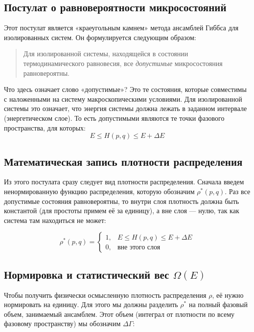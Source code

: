 \documentclass[../general/general]{subfiles}
\begin{document}
\subsection{Постулат о равновероятности микросостояний}

Этот постулат является «краеугольным камнем» метода ансамблей Гиббса для изолированных систем. Он формулируется следующим образом:

\begin{quote}
    Для изолированной системы, находящейся в состоянии термодинамического равновесия, все \textit{допустимые} микросостояния равновероятны.
\end{quote}

Что здесь означает слово «допустимые»? Это те состояния, которые совместимы с наложенными на систему макроскопическими условиями. Для изолированной системы это означает, что энергия системы должна лежать в заданном интервале (энергетическом слое). То есть допустимыми являются те точки фазового пространства, для которых:
\begin{equation}
    E \le H(p, q) \le E + \Delta E
\end{equation}

\subsection{Математическая запись плотности распределения}

Из этого постулата сразу следует вид плотности распределения. Сначала введем ненормированную функцию распределения, которую обозначим $\rho^*(p, q)$. Раз все допустимые состояния равновероятны, то внутри слоя плотность должна быть константой (для простоты примем её за единицу), а вне слоя — нулю, так как система там находиться не может:

\begin{equation}
    \rho^*(p, q) = 
    \begin{cases} 
      1, & E \le H(p, q) \le E + \Delta E \\
      0, & \text{вне этого слоя}
    \end{cases}
\end{equation}


\subsection{Нормировка и статистический вес $\Omega(E)$}

Чтобы получить физически осмысленную плотность распределения $\rho$, её нужно нормировать на единицу. Для этого мы должны разделить $\rho^*$ на полный фазовый объем, занимаемый ансамблем. Этот объем (интеграл от плотности по всему фазовому пространству) мы обозначим $\Delta \Gamma$:
\end{document}
